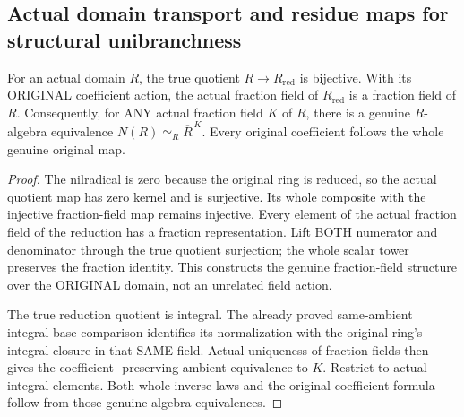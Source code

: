\subsection{Actual domain transport and residue maps for structural unibranchness}
\label{subsec:domain-local-normalizations}

\begin{theorem}
\label{algebra:domain-reduced-normalization-comparison}
For an actual domain $R$, the true quotient $R\to R_{\mathrm{red}}$
is bijective. With its ORIGINAL coefficient action, the actual fraction
field of $R_{\mathrm{red}}$ is a fraction field of $R$. Consequently,
for ANY actual fraction field $K$ of $R$, there is a genuine
$R$-algebra equivalence $N(R)\simeq_R\overline R^{\,K}$.
Every original coefficient follows the whole genuine original map.
\leanok
\end{theorem}
\begin{proof}
The nilradical is zero because the original ring is reduced, so the
actual quotient map has zero kernel and is surjective. Its whole
composite with the injective fraction-field map remains injective.
Every element of the actual fraction field of the reduction has a
fraction representation. Lift BOTH numerator and denominator through
the true quotient surjection; the whole scalar tower preserves the
fraction identity. This constructs the genuine fraction-field
structure over the ORIGINAL domain, not an unrelated field action.

The true reduction quotient is integral. The already proved
same-ambient integral-base comparison identifies its normalization
with the original ring's integral closure in that SAME field.
Actual uniqueness of fraction fields then gives the coefficient-
preserving ambient equivalence to $K$. Restrict to actual integral
elements. Both whole inverse laws and the original coefficient
formula follow from those genuine algebra equivalences.
\end{proof}

